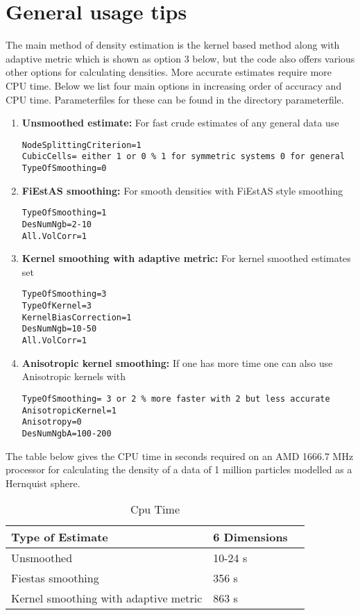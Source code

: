 \documentclass{article}
\begin{document}
\section{General usage tips}
The main method of density estimation is the kernel based 
method along with adaptive metric which is shown as option $3$ 
below, but the code also offers various other options for calculating densities. 
More accurate estimates require more CPU time.
Below we list four main options in increasing order of accuracy
and CPU time. Parameterfiles for these can be found in the directory 
parameterfile.
\begin{enumerate}
\item {\bf Unsmoothed estimate:}  \newline
For fast crude estimates of any general data use
\begin{verbatim}
NodeSplittingCriterion=1
CubicCells= either 1 or 0 % 1 for symmetric systems 0 for general
TypeOfSmoothing=0 
\end{verbatim}
\item {\bf FiEstAS smoothing:}  \newline
For smooth densities with FiEstAS  
style smoothing 
\begin{verbatim}
TypeOfSmoothing=1
DesNumNgb=2-10 
All.VolCorr=1
\end{verbatim}
\item {\bf Kernel smoothing with adaptive metric:} \newline 
For kernel smoothed estimates  set
\begin{verbatim}
TypeOfSmoothing=3
TypeOfKernel=3
KernelBiasCorrection=1 
DesNumNgb=10-50
All.VolCorr=1
\end{verbatim}
\item {\bf Anisotropic kernel smoothing:}  \newline
If one has more time one can also 
use Anisotropic kernels with 
\begin{verbatim}
TypeOfSmoothing= 3 or 2 % more faster with 2 but less accurate
AnisotropicKernel=1
Anisotropy=0
DesNumNgbA=100-200
\end{verbatim}
\end{enumerate}
\newpage
The table below gives the CPU time in seconds required  on an AMD  1666.7 MHz
processor for calculating the density of a data 
of 1 million particles modelled as a Hernquist sphere.
\begin{table}[here]
\begin{center}
\caption{Cpu Time}
\begin{tabular}{|p{6.0cm}|p{2.5cm}|p{2.5cm}|}
\hline
Type of Estimate                  & 6 Dimensions \\
\hline
\hline
Unsmoothed                        &   10-24 s          \\
Fiestas smoothing                  &   356 s         \\
Kernel smoothing with adaptive metric   &   863 s \\
\hline 
\end{tabular}
\end{center}
\end{table}
\end{document}
